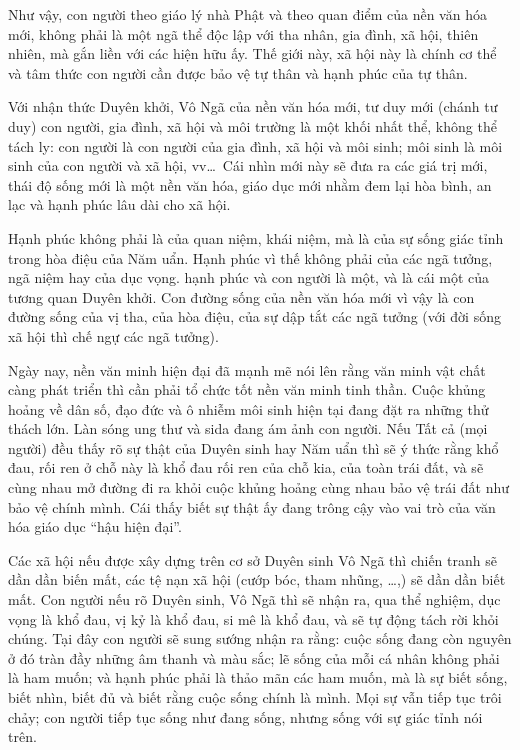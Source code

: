 Như vậy, con người theo giáo lý nhà Phật và theo quan điểm của nền văn hóa mới, không phải là một ngã thể độc lập với tha nhân, gia đình, xã hội, thiên nhiên, mà gắn liền với các hiện hữu ấy. Thế giới này, xã hội này là chính cơ thể và tâm thức con người cần được bảo vệ tự thân và hạnh phúc của tự thân.

Với nhận thức Duyên khởi, Vô Ngã của nền văn hóa mới, tư duy mới (chánh tư duy) con người, gia đình, xã hội và môi trường là một khối nhất thể, không thể tách ly: con người là con người của gia đình, xã hội và môi sinh; môi sinh là môi sinh của con người và xã hội, vv\ldots ~Cái nhìn mới này sẽ đưa ra các giá trị mới, thái độ sống mới là một nền văn hóa, giáo dục mới nhằm đem lại hòa bình, an lạc và hạnh phúc lâu dài cho xã hội.

Hạnh phúc không phải là của quan niệm, khái niệm, mà là của sự sống giác tỉnh trong hòa điệu của Năm uẩn. Hạnh phúc vì thế không phải của các ngã tưởng, ngã niệm hay của dục vọng. hạnh phúc và con người là một, và là cái một của tương quan Duyên khởi. Con đường sống của nền văn hóa mới vì vậy là con đường sống của vị tha, của hòa điệu, của sự dập tắt các ngã tưởng (với đời sống xã hội thì chế ngự các ngã tưởng).

Ngày nay, nền văn minh hiện đại đã mạnh mẽ nói lên rằng văn minh vật chất càng phát triển thì cần phải tổ chức tốt nền văn minh tinh thần. Cuộc khủng hoảng về dân số, đạo đức và ô nhiễm môi sinh hiện tại đang đặt ra những thử thách lớn. Làn sóng ung thư và sida đang ám ảnh con người. Nếu Tất cả (mọi người) đều thấy rõ sự thật của Duyên sinh hay Năm uẩn thì sẽ ý thức rằng khổ đau, rối ren ở chỗ này là khổ đau rối ren của chỗ kia, của toàn trái đất, và sẽ cùng nhau mở đường đi ra khỏi cuộc khủng hoảng cùng nhau bảo vệ trái đất như bảo vệ chính mình. Cái thấy biết sự thật ấy đang trông cậy vào vai trò của văn hóa giáo dục ``hậu hiện đại''.

Các xã hội nếu được xây dựng trên cơ sở Duyên sinh Vô Ngã thì chiến tranh sẽ dần dần biến mất, các tệ nạn xã hội (cướp bóc, tham nhũng, \ldots,) sẽ dần dần biết mất. Con người nếu rõ Duyên sinh, Vô Ngã thì sẽ nhận ra, qua thể nghiệm, dục vọng là khổ đau, vị kỷ là khổ đau, si mê là khổ đau, và sẽ tự động tách rời khỏi chúng. Tại đây con người sẽ sung sướng nhận ra rằng: cuộc sống đang còn nguyên ở đó tràn đầy những âm thanh và màu sắc; lẽ sống của mỗi cá nhân không phải là ham muốn; và hạnh phúc phải là thảo mãn các ham muốn, mà là sự biết sống, biết nhìn, biết đủ và biết rằng cuộc sống chính là mình. Mọi sự vẫn tiếp tục trôi chảy; con người tiếp tục sống như đang sống, nhưng sống với sự giác tỉnh nói trên.

